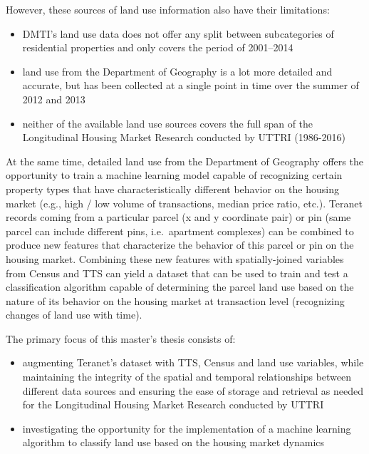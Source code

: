 \vspace{5mm}

However, these sources of land use information also have their limitations:
\begin{itemize}
    \item DMTI's land use data does not offer any split between subcategories of residential properties and only covers the period of 2001--2014
    \item land use from the Department of Geography is a lot more detailed and accurate, but has been collected at a single point in time over the summer of 2012 and 2013
    \item neither of the available land use sources covers the full span of the Longitudinal Housing Market Research conducted by UTTRI (1986-2016)
\end{itemize}

At the same time, detailed land use from the Department of Geography offers the opportunity to train a machine learning model capable of recognizing certain property types that have characteristically different behavior on the housing market (e.g., high / low volume of transactions, median price ratio, etc.).
Teranet records coming from a particular parcel (x and y coordinate pair) or pin (same parcel can include different pins, i.e.\ apartment complexes) can be combined to produce new features that characterize the behavior of this parcel or pin on the housing market.
Combining these new features with spatially-joined variables from Census and TTS can yield a dataset that can be used to train and test a classification algorithm capable of determining the parcel land use based on the nature of its behavior on the housing market at transaction level (recognizing changes of land use with time).

\vspace{5mm}

The primary focus of this master's thesis consists of:

\begin{itemize}
    \item augmenting Teranet's dataset with TTS, Census and land use variables, while maintaining the integrity of the spatial and temporal relationships between different data sources and ensuring the ease of storage and retrieval as needed for the Longitudinal Housing Market Research conducted by UTTRI
    \item investigating the opportunity for the implementation of a machine learning algorithm to classify land use based on the housing market dynamics
\end{itemize}

